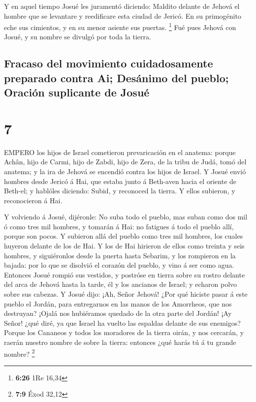  Y en aquel tiempo Josué les juramentó diciendo: Maldito
delante de Jehová el hombre que se levantare y reedificare esta ciudad
de Jericó. En su primogénito eche sus cimientos, y en su menor asiente
sus puertas. \footnote{\textbf{6:26} 1Re 16,34}  Fué pues
Jehová con Josué, y su nombre se divulgó por toda la tierra.

\hypertarget{fracaso-del-movimiento-cuidadosamente-preparado-contra-ai-desuxe1nimo-del-pueblo-oraciuxf3n-suplicante-de-josuuxe9}{%
\subsection{Fracaso del movimiento cuidadosamente preparado contra Ai;
Desánimo del pueblo; Oración suplicante de
Josué}\label{fracaso-del-movimiento-cuidadosamente-preparado-contra-ai-desuxe1nimo-del-pueblo-oraciuxf3n-suplicante-de-josuuxe9}}

\hypertarget{section-6}{%
\section{7}\label{section-6}}

 EMPERO los hijos de Israel cometieron prevaricación en el
anatema: porque Achân, hijo de Carmi, hijo de Zabdi, hijo de Zera, de la
tribu de Judá, tomó del anatema; y la ira de Jehová se encendió contra
los hijos de Israel.  Y Josué envió hombres desde Jericó á
Hai, que estaba junto á Beth-aven hacia el oriente de Beth-el; y
hablóles diciendo: Subid, y reconoced la tierra. Y ellos subieron, y
reconocieron á Hai.

 Y volviendo á Josué, dijéronle: No suba todo el pueblo, mas
suban como dos mil ó como tres mil hombres, y tomarán á Hai: no fatigues
á todo el pueblo allí, porque son pocos.  Y subieron allá
del pueblo como tres mil hombres, los cuales huyeron delante de los de
Hai.  Y los de Hai hirieron de ellos como treinta y seis
hombres, y siguiéronlos desde la puerta hasta Sebarim, y los rompieron
en la bajada: por lo que se disolvió el corazón del pueblo, y vino á ser
como agua.  Entonces Josué rompió sus vestidos, y postróse
en tierra sobre su rostro delante del arca de Jehová hasta la tarde, él
y los ancianos de Israel; y echaron polvo sobre sus cabezas.
 Y Josué dijo: ¡Ah, Señor Jehová! ¿Por qué hiciste pasar á
este pueblo el Jordán, para entregarnos en las manos de los Amorrheos,
que nos destruyan? ¡Ojalá nos hubiéramos quedado de la otra parte del
Jordán!  ¡Ay Señor! ¿qué diré, ya que Israel ha vuelto las
espaldas delante de sus enemigos?  Porque los Cananeos y
todos los moradores de la tierra oirán, y nos cercarán, y raerán nuestro
nombre de sobre la tierra: entonces ¿qué harás tú á tu grande nombre?
\footnote{\textbf{7:9} Éxod 32,12}

